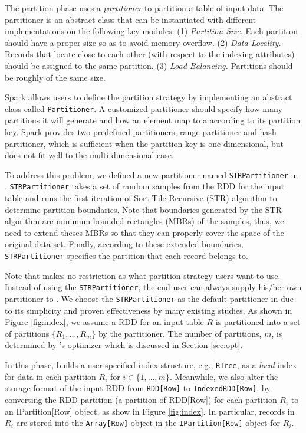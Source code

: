  The partition phase uses a {\em partitioner} to
partition a table of input data. The partitioner is an abstract class
that can be instantiated with different implementations on the
following key modules: (1) \emph{Partition Size.} Each partition
should have a proper size so as to avoid memory overflow. (2)
\emph{Data Locality.}  Records that locate close to each other (with
respect to the indexing attributes) should be assigned to the same
partition. (3) \emph{Load Balancing.} Partitions should be roughly of
the same size.

Spark allows users to define the partition strategy by implementing an
abstract class called \texttt{Partitioner}. A customized partitioner
should specify how many partitions it will generate and how an element
map to a according to its partition key. Spark provides two predefined
partitioners, range partitioner and hash partitioner, which is
sufficient when the partition key is one dimensional, but does not fit
well to the multi-dimensional case.

To address this problem, we defined a new partitioner named
\texttt{STRPartitioner} in \name. \texttt{STRPartitioner} takes a set
of random samples from the RDD for the input table and runs the first
iteration of Sort-Tile-Recursive (STR) algorithm \cite{str} to
determine partition boundaries. Note that boundaries generated by the
STR algorithm are minimum bounded rectangles (MBRs) of the samples,
thus, we need to extend theses MBRs so that they can properly cover
the space of the original data set. Finally, according to these
extended boundaries, \texttt{STRPartitioner} specifies the partition
that each record belongs to.

Note that \name makes no restriction as what partition strategy users
want to use. Instead of using the \texttt{STRPartitioner}, the end
user can always supply his/her own partitioner to \name. We choose the
\texttt{STRPartitioner} as the default partitioner in \name due to its
simplicity and proven effectiveness by many existing studies. As shown
in Figure \ref{fig:index}, we assume a RDD for an input table $R$ is
partitioned into a set of partitions $\{R_1, \ldots, R_m\}$ by the
partitioner. The number of partitions, $m$, is determined by \name's
optimizer which is discussed in Section \ref{sec:opt}.

 In this phase, \name builds a user-specified
index structure, e.g., \texttt{RTree}, as a \emph{local} index for
data in each partition $R_i$ for $i\in\{1, \ldots, m\}$. Meanwhile, we
also alter the storage format of the input RDD from \texttt{RDD[Row]}
to \texttt{IndexedRDD[Row]}, by converting the RDD partition (a
partition of RDD[Row]) for each partition $R_i$ to an IPartition[Row]
object, as show in Figure \ref{fig:index}. In particular, records in
$R_i$ are stored into the \texttt{Array[Row]} object in the
\texttt{IPartition[Row]} object for $R_i$.

